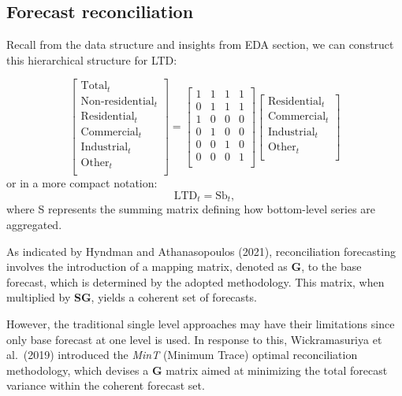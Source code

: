 \documentclass[11pt,a4paper,]{article}
\begin{document}
\subsection{Forecast reconciliation}\label{forecast-reconciliation}

Recall from the data structure and insights from EDA section, we can construct this hierarchical structure for LTD:

\[
\begin{bmatrix}
  \text{Total}_{t} \\
  \text{Non-residential}_{t} \\
  \text{Residential}_{t} \\
  \text{Commercial}_{t} \\
  \text{Industrial}_{t} \\
  \text{Other}_{t} \\
  \end{bmatrix}
=
\begin{bmatrix}
  1 & 1 & 1 & 1 \\
  0 & 1 & 1 & 1 \\
  1 & 0 & 0 & 0 \\
  0 & 1 & 0 & 0 \\
  0 & 0 & 1 & 0 \\
  0 & 0 & 0 & 1 \\
\end{bmatrix}
\begin{bmatrix}
  \text{Residential}_{t} \\
  \text{Commercial}_{t} \\
  \text{Industrial}_{t} \\
  \text{Other}_{t} \\
\end{bmatrix}
\]
or in a more compact notation:
\[
\text{LTD}_{t} = \text{S}\text{b}_{t},
\]
where S represents the summing matrix defining how bottom-level series are aggregated.

As indicated by Hyndman and Athanasopoulos (2021), reconciliation forecasting involves the introduction of a mapping matrix, denoted as \textbf{G}, to the base forecast, which is determined by the adopted methodology. This matrix, when multiplied by \textbf{SG}, yields a coherent set of forecasts.

However, the traditional single level approaches may have their limitations since only base forecast at one level is used. In response to this, Wickramasuriya et al.~(2019) introduced the \emph{MinT} (Minimum Trace) optimal reconciliation methodology, which devises a \textbf{G} matrix aimed at minimizing the total forecast variance within the coherent forecast set.
\end{document}
